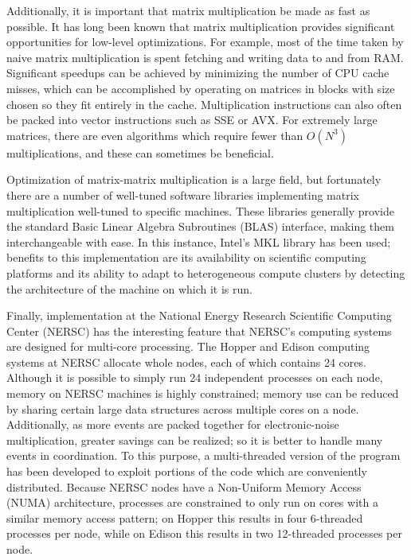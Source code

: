 Additionally, it is important that matrix multiplication be made as fast as possible.  It has long been known that matrix multiplication provides significant opportunities for low-level optimizations. For example, most of the time taken by naive matrix multiplication is spent fetching and writing data to and from RAM.  Significant speedups can be achieved by minimizing the number of CPU cache misses, which can be accomplished by operating on matrices in blocks with size chosen so they fit entirely in the cache.  Multiplication instructions can also often be packed into vector instructions such as SSE or AVX.  For extremely large matrices, there are even algorithms which require fewer than $O(N^3)$ multiplications, and these can sometimes be beneficial.~\cite{AnatomyOfMatrixMultiply}

Optimization of matrix-matrix multiplication is a large field, but fortunately there are a number of well-tuned software libraries implementing matrix multiplication well-tuned to specific machines.  These libraries generally provide the standard Basic Linear Algebra Subroutines (BLAS) interface, making them interchangeable with ease.  In this instance, Intel's MKL library has been used; benefits to this implementation are its availability on scientific computing platforms and its ability to adapt to heterogeneous compute clusters by detecting the architecture of the machine on which it is run.~\cite{IntelMKL}

Finally, implementation at the National Energy Research Scientific Computing Center (NERSC) has the interesting feature that NERSC's computing systems are designed for multi-core processing.  The Hopper and Edison computing systems at NERSC allocate whole nodes, each of which contains 24 cores.  Although it is possible to simply run 24 independent processes on each node, memory on NERSC machines is highly constrained; memory use can be reduced by sharing certain large data structures across multiple cores on a node.  Additionally, as more events are packed together for electronic-noise multiplication, greater savings can be realized; so it is better to handle many events in coordination.  To this purpose, a multi-threaded version of the program has been developed to exploit portions of the code which are conveniently distributed.  Because NERSC nodes have a Non-Uniform Memory Access (NUMA) architecture, processes are constrained to only run on cores with a similar memory access pattern; on Hopper this results in four 6-threaded processes per node, while on Edison this results in two 12-threaded processes per node.

